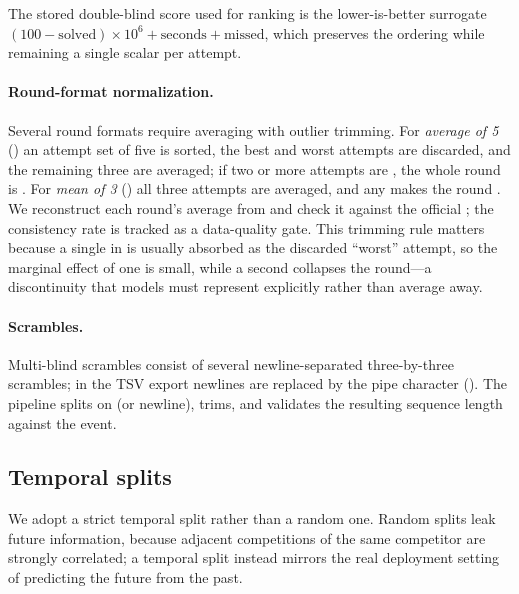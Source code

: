 The stored double-blind score used for ranking is the lower-is-better surrogate
$(100-\text{solved})\times 10^6 + \text{seconds} + \text{missed}$, which
preserves the \wca{} ordering while remaining a single scalar per attempt.

\paragraph{Round-format normalization.}
Several round formats require averaging with outlier trimming. For
\emph{average of 5} () an attempt set of five is sorted, the best and
worst attempts are discarded, and the remaining three are averaged; if two or
more attempts are \DNF{}, the whole round is \DNF{}. For \emph{mean of 3}
() all three attempts are averaged, and any \DNF{} makes the round
\DNF{}. We reconstruct each round's average from  and
check it against the official ; the consistency rate is
tracked as a data-quality gate. This trimming rule matters because a single
\DNF{} in  is usually absorbed as the discarded ``worst'' attempt,
so the marginal effect of one \DNF{} is small, while a second \DNF{} collapses
the round---a discontinuity that models must represent explicitly rather than
average away.

\paragraph{Scrambles.}
Multi-blind scrambles consist of several newline-separated three-by-three
scrambles; in the TSV export newlines are replaced by the pipe character
(\code{|}). The pipeline splits on \code{|} (or newline), trims, and validates
the resulting sequence length against the event.

\subsection{Temporal splits}
\label{sec:data-splits}

We adopt a strict temporal split rather than a random one. Random splits leak
future information, because adjacent competitions of the same competitor are
strongly correlated; a temporal split instead mirrors the real deployment
setting of predicting the future from the past.

